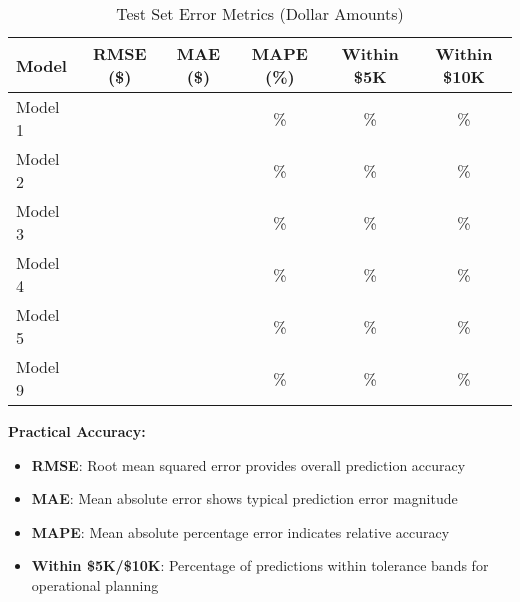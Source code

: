 \begin{table}[h!]
\centering
\caption{Test Set Error Metrics (Dollar Amounts)}
\label{tab:error_magnitude}
\begin{tabular}{lccccc}
\toprule
\textbf{Model} & \textbf{RMSE (\$)} & \textbf{MAE (\$)} & \textbf{MAPE (\%)} & \textbf{Within \$5K} & \textbf{Within \$10K} \\
\midrule
Model 1 & \ModelOneRMSETest{} & \ModelOneMAETest{} & \ModelOneMAPETest{}\% & \ModelOneWithinFiveK{}\% & \ModelOneWithinTenK{}\% \\
Model 2 & \ModelTwoRMSETest{} & \ModelTwoMAETest{} & \ModelTwoMAPETest{}\% & \ModelTwoWithinFiveK{}\% & \ModelTwoWithinTenK{}\% \\
Model 3 & \ModelThreeRMSETest{} & \ModelThreeMAETest{} & \ModelThreeMAPETest{}\% & \ModelThreeWithinFiveK{}\% & \ModelThreeWithinTenK{}\% \\
Model 4 & \ModelFourRMSETest{} & \ModelFourMAETest{} & \ModelFourMAPETest{}\% & \ModelFourWithinFiveK{}\% & \ModelFourWithinTenK{}\% \\
Model 5 & \ModelFiveRMSETest{} & \ModelFiveMAETest{} & \ModelFiveMAPETest{}\% & \ModelFiveWithinFiveK{}\% & \ModelFiveWithinTenK{}\% \\
Model 9 & \ModelNineRMSETest{} & \ModelNineMAETest{} & \ModelNineMAPETest{}\% & \ModelNineWithinFiveK{}\% & \ModelNineWithinTenK{}\% \\
\bottomrule
\end{tabular}
\end{table}

\textbf{Practical Accuracy:}
\begin{itemize}
    \item \textbf{RMSE}: Root mean squared error provides overall prediction accuracy
    \item \textbf{MAE}: Mean absolute error shows typical prediction error magnitude
    \item \textbf{MAPE}: Mean absolute percentage error indicates relative accuracy
    \item \textbf{Within \$5K/\$10K}: Percentage of predictions within tolerance bands for operational planning
\end{itemize}